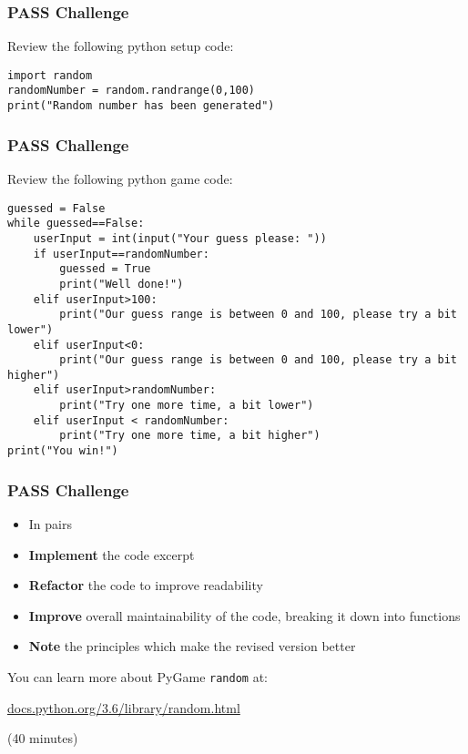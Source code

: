 \begin{frame}[fragile]
	\frametitle{PASS Challenge}
		
	Review the following python setup code:

	\begin{lstlisting}
import random
randomNumber = random.randrange(0,100)
print("Random number has been generated")
 	\end{lstlisting}
		
\end{frame}

\begin{frame}[fragile]
	\frametitle{PASS Challenge}
		
	Review the following python game code:

	\begin{lstlisting}
guessed = False
while guessed==False:
    userInput = int(input("Your guess please: "))
    if userInput==randomNumber:
        guessed = True
        print("Well done!")
    elif userInput>100:
        print("Our guess range is between 0 and 100, please try a bit lower")
    elif userInput<0:
        print("Our guess range is between 0 and 100, please try a bit higher")
    elif userInput>randomNumber:
        print("Try one more time, a bit lower")
    elif userInput < randomNumber:
        print("Try one more time, a bit higher")
print("You win!")
	\end{lstlisting}
		
\end{frame}

\begin{frame}
	\frametitle{PASS Challenge}
	
	\begin{itemize}
		\item In pairs
		\item \textbf{Implement} the code excerpt
		\item \textbf{Refactor} the code to improve readability
		\item \textbf{Improve} overall maintainability of the code, breaking it down into functions
		\item \textbf{Note} the principles which make the revised version better
	\end{itemize}
	
	You can learn more about PyGame \texttt{random} at:
	
	\vspace{1em}
	
	 \url{docs.python.org/3.6/library/random.html}
	
	\vspace{1em}
	
	(40 minutes)
	
\end{frame}